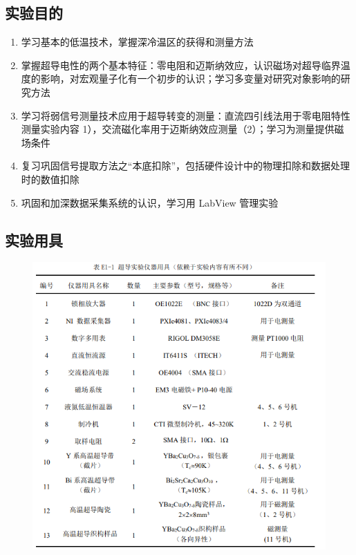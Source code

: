 \documentclass{ctexart}                                     %
\theoremstyle{ansstyle}
\begin{document}
\subsection{实验目的}

\begin{enumerate}
    \item 学习基本的低温技术，掌握深冷温区的获得和测量方法
    \item 掌握超导电性的两个基本特征：零电阻和迈斯纳效应，认识磁场对超导临界温度的影响，对宏观量子化有一个初步的认识；学习多变量对研究对象影响的研究方法
    \item 学习将弱信号测量技术应用于超导转变的测量：直流四引线法用于零电阻特性测量实验内容 1），交流磁化率用于迈斯纳效应测量（2）；学习为测量提供磁场条件
    \item 复习巩固信号提取方法之“本底扣除”，包括硬件设计中的物理扣除和数据处理时的数值扣除
    \item 巩固和加深数据采集系统的认识，学习用 LabView 管理实验
\end{enumerate}

\subsection{实验用具}
\begin{figure}[H]
    \centering
    \includegraphics[width=1.0\linewidth]{./png/z1.png}
\end{figure}
\end{document}
